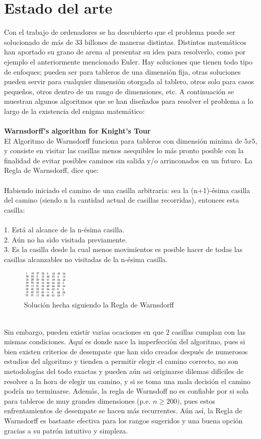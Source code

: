 \documentclass[journal, 10pt]{IEEEtran}
\begin{document}
\section{Estado del arte}
Con el trabajo de ordenadores se ha descubierto que el problema puede ser solucionado de más de 33 billones de maneras distintas. Distintos matemáticos han aportado su grano de arena al presentar su idea para resolverlo, como por ejemplo el anteriormente mencionado Euler. Hay soluciones que tienen todo tipo de enfoques; pueden ser para tableros de una dimensión fija, otras soluciones pueden servir para cualquier dimensión otorgada al tablero, otros solo para casos pequeños, otros dentro de un rango de dimensiones, etc. A continuación se muestran algunos algoritmos que se han diseñados para resolver el problema a lo largo de la existencia del enigma matemático:\\
\\\textbf{Warnsdorff’s algorithm for Knight’s Tour}\\
El Algoritmo de Warnsdorff funciona para tableros con dimensión minima de $5x5$, y consiste en visitar las casillas menos asequibles lo más pronto posible con la finalidad de evitar posibles caminos sin salida y/o arrinconados en un futuro. La Regla de Warnsdorff\cite{Squirrel:1996}, dice que:\\
\\Habiendo iniciado el camino de una casilla arbitraria: sea la (n+1)-ésima casilla del camino (siendo n la cantidad actual de casillas recorridas), entonces esta casilla:\\
\\1. Está al alcance de la n-ésima casilla.\\
2. Aún no ha sido visitada previamente.\\
3. Es la casilla desde la cual menos movimientos es posible hacer de todas las casillas alcanzables no visitadas de la n-ésima casilla.\\
\begin{figure}[h]
\centering
\includegraphics[width=0.2\textwidth]{figures/warnsdorff.png}
\caption{Soluci\'on hecha siguiendo la Regla de Warnsdorff}
\label{fig:euler}
\end{figure}
\\Sin embargo, pueden existir varias ocaciones en que 2 casillas cumplan con las mismas condiciones. Aquí es donde nace la imperfección del algoritmo, pues si bien existen criterios de desempate que han sido creados después de numerosos estudios del algoritmo y tienden a permitir elegir el camino correcto, no son metodologías del todo exactas y pueden aún asi originarse dilemas difíciles de resolver a la hora de elegir un camino, y si se toma una mala decisión el camino podría no terminarse. Además, la regla de Warnsdoff no es confiable por si sola para tableros de muy grandes dimensiones (p.e. $n \geq 200)$, pues estos enfrentamientos de desempate se hacen más recurrentes. Aún así, la Regla de Warnsdorff es bastante efectiva para los rangos sugeridos y una buena opción gracias a su patrón intuitivo y simpleza.
\end{document}
